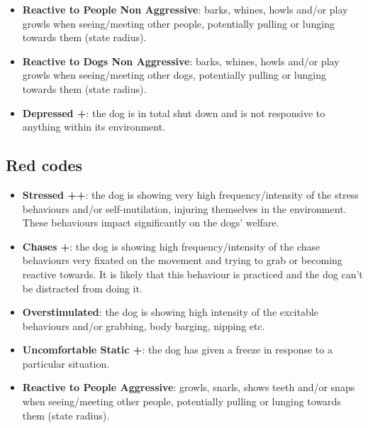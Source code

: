 \documentclass[12pt]{article}
\begin{document}
\begin{itemize}
  \item \textbf{Reactive to People Non Aggressive}: barks, whines, howls and/or play growls when seeing/meeting other people, potentially pulling or lunging towards them (state radius).
  \item \textbf{Reactive to Dogs Non Aggressive}: barks, whines, howls and/or play growls when seeing/meeting other dogs, potentially pulling or lunging towards them (state radius).
  \item \textbf{Depressed +}: the dog is in total shut down and is not responsive to anything
  within its environment.
\end{itemize}

\subsection{Red codes}

\begin{itemize}
  \item \textbf{Stressed ++}: the dog is showing very high frequency/intensity of the stress behaviours and/or self-mutilation, injuring themselves in the environment. These behaviours impact significantly on the dogs’ welfare.
  \item \textbf{Chases +}: the dog is showing high frequency/intensity of the chase behaviours very fixated on the movement and trying to grab or becoming reactive towards. It is likely that this behaviour is practiced and the dog can’t be distracted from doing it.
  \item \textbf{Overstimulated}: the dog is showing high intensity of the excitable behaviours and/or grabbing, body barging, nipping etc.
  \item \textbf{Uncomfortable Static +}: the dog has given a freeze in response to a particular situation.
  \item \textbf{Reactive to People Aggressive}: growls, snarls, shows teeth and/or snaps when seeing/meeting other people, potentially pulling or lunging towards them (state radius).

\end{itemize}
\end{document}
